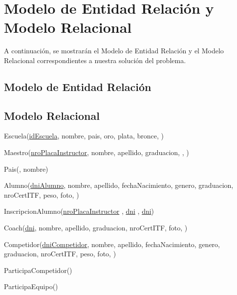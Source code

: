 \section{Modelo de Entidad Relación y Modelo Relacional}

A continuación, se mostrarán el Modelo de Entidad Relación y el Modelo Relacional correspondientes a nuestra solución del problema.

\subsection{Modelo de Entidad Relación}

\subsection{Modelo Relacional}

Escuela(\uline{idEscuela}, nombre, pais, oro, plata, bronce, )


Maestro(\uline{nroPlacaInstructor}, nombre, apellido, graduacion, , )

Pais(, nombre)

Alumno(\uline{dniAlumno}, nombre, apellido, fechaNacimiento, genero, graduacion, nroCertITF, peso, foto, )

InscripcionAlumno(\uline{nroPlacaInstructor} , \uline{dni} , \uline{dni})

Coach(\uline{dni}, nombre, apellido, graduacion, nroCertITF, foto,  )

Competidor(\uline{dniCompetidor}, nombre, apellido, fechaNacimiento, genero, graduacion, nroCertITF, peso, foto, )

ParticipaCompetidor()

ParticipaEquipo()



